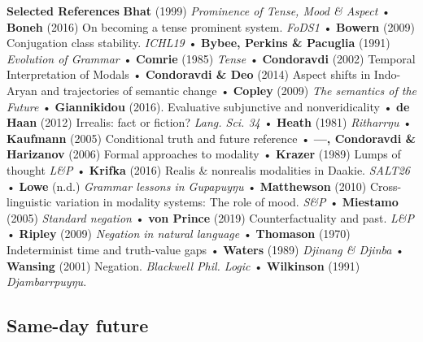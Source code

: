 \documentclass[dvipsnames]{beamer}%
\begin{document}
\begin{frame}{\textbf{Selected References}}\footnotesize
 \textbf{Bhat} (1999) \textit{Prominence of Tense, Mood \& Aspect} • \textbf{Boneh} (2016) On becoming a tense prominent system. \textit{FoDS1} • \textbf{Bowern} (2009) Conjugation class stability. \textit{ICHL19} • \textbf{Bybee, Perkins \& Pacuglia }(1991) \textit{Evolution of Grammar} • \textbf{Comrie} (1985) \textit{Tense} • \textbf{Condoravdi} (2002) Temporal Interpretation of Modals • \textbf{Condoravdi \& Deo} (2014) Aspect shifts in Indo-Aryan and trajectories of semantic change • \textbf{Copley} (2009) \textit{The semantics of the Future} • \textbf{Giannikidou} (2016). Evaluative subjunctive and nonveridicality • \textbf{de Haan} (2012) Irrealis: fact or fiction? \textit{Lang. Sci. 34} • \textbf{Heath} (1981) \textit{Ritharrŋu} •  \textbf{Kaufmann} (2005) Conditional truth and future reference • \textbf{---, Condoravdi \& Harizanov} (2006) Formal approaches to modality • \textbf{Krazer} (1989) Lumps of thought \textit{L\&P} • \textbf{Krifka} (2016) Realis \& nonrealis modalities in Daakie. \textit{SALT26} • \textbf{Lowe} (n.d.) \textit{Grammar lessons in Gupapuyŋu} • \textbf{Matthewson} (2010) Cross-linguistic variation in modality systems: The role of mood. \textit{S\&P} • \textbf{Miestamo} (2005) \textit{Standard negation} •\textbf{ von Prince }(2019) Counterfactuality and past. \textit{L\&P} • \textbf{Ripley} (2009) \textit{Negation in natural language} • \textbf{Thomason} (1970) Indeterminist time and truth-value gaps • \textbf{Waters} (1989) \textit{Djinang \& Djinba} • \textbf{Wansing} (2001) Negation. \textit{Blackwell Phil. Logic} • \textbf{Wilkinson} (1991) \textit{Djambarrpuyŋu}.

%	
\end{frame}
\subsection*{Same-day future}
\end{document}
